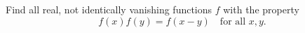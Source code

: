 Find all real, not identically vanishing functions $f$ with the property
\[ f(x)f(y) = f(x - y) \quad\text{for all } x, y. \]
